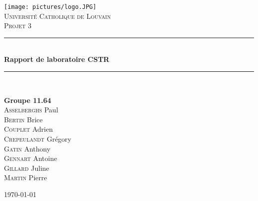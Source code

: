 \usepackage{etoolbox}
\newcommand{\ppath}[2][$\;\triangleright\;$]{%
	  \def\nextitem{\def\nextitem{#1}}%
	    \renewcommand*{\do}[1]{\nextitem\textsf{##1}}%
		  \docsvlist{#2}%
	  }

\newcommand{\HRule}{\rule{\linewidth}{0.5mm}}

\fancyhf{} %
\fancyhead[R]{\thepage} %


\pagestyle{fancy}
\thispagestyle{empty}
\begin{titlepage}
\begin{center}

\texttt{[image: pictures/logo.JPG]}~\\[1cm]

\textsc{\LARGE Université Catholique de Louvain}\\[1.5cm]

\textsc{\Large Projet 3}\\[0.5cm]

\HRule \\[0.4cm]
{ \huge \bfseries Rapport de laboratoire CSTR\\[0.4cm] }

\HRule \\[1.5cm]

\begin{minipage}{0.4\textwidth}
\begin{flushleft} \large
\textbf{Groupe \textsc{11.64}} \\
\textsc{Asselberghs} Paul \\
\textsc{Bertin} Brice \\
\textsc{Couplet} Adrien \\
\textsc{Crepeulandt} Grégory \\
\textsc{Gatin} Anthony \\
\textsc{Gennart} Antoine \\
\textsc{Gillard} Juline \\
\textsc{Martin} Pierre


\end{flushleft}
\end{minipage}
\begin{minipage}{0.4\textwidth}
\begin{flushright} \large
\end{flushright}
\end{minipage}

\setcounter{tocdepth}{2}
\tableofcontents %

\vfill

{\large \today}
\end{center}
\end{titlepage}
\clearpage
{}
\newpage

\thispagestyle{empty}
